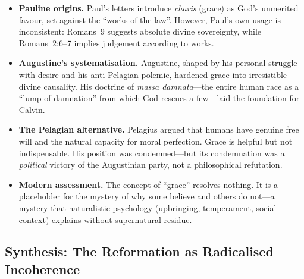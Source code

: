 \documentclass[11pt,twoside]{article}
\begin{document}
\begin{scheda}

\begin{itemize}
  \item \textbf{Pauline origins.}
    Paul's letters introduce \textit{charis} (grace) as
    God's unmerited favour, set against the ``works of the
    law''.  However, Paul's own usage is
    inconsistent: Romans~9 suggests absolute divine sovereignty, while
    Romans~2:6--7 implies judgement according to works.

  \item \textbf{Augustine's systematisation.}
    Augustine, shaped by his personal struggle with desire and his
    anti-Pelagian polemic, hardened grace into
    irresistible divine causality.  His doctrine of \textit{massa
    damnata}---the entire human race as a ``lump of
    damnation'' from which God rescues a few---laid the foundation for
    Calvin.

  \item \textbf{The Pelagian alternative.}
    Pelagius argued that humans have genuine free will
    and the natural capacity for moral perfection.  Grace is helpful but
    not indispensable.  His position was condemned---but its condemnation
    was a \emph{political} victory of the Augustinian party, not a
    philosophical refutation.

  \item \textbf{Modern assessment.}
    The concept of ``grace'' resolves nothing.  It is a placeholder for
    the mystery of why some believe and others do not---a mystery that
    naturalistic psychology (upbringing,
    temperament, social context) explains without supernatural residue.
\end{itemize}
\end{scheda}

\subsection{Synthesis: The Reformation as Radicalised Incoherence}
\end{document}
